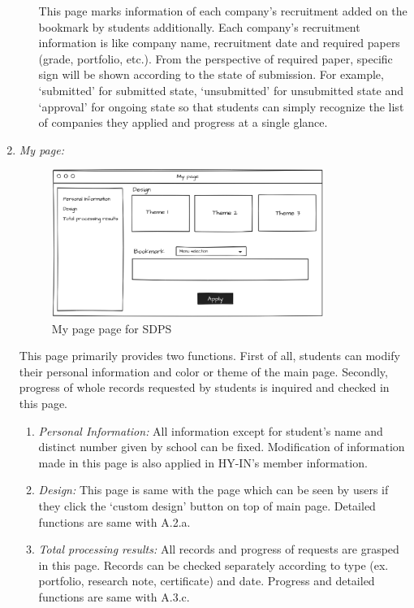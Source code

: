\documentclass[conference]{IEEEtran}
\begin{document}
\begin{enumerate}
\begin{enumerate}
        This page marks information of each company’s recruitment added on the bookmark by students additionally. Each company’s recruitment information is like company name, recruitment date and required papers (grade, portfolio, etc.). From the perspective of required paper, specific sign will be shown according to the state of submission. For example, ‘submitted’ for submitted state, ‘unsubmitted’ for unsubmitted state and ‘approval’ for ongoing state so that students can simply recognize the list of companies they applied and progress at a single glance.\\
    \end{enumerate}    
    \vspace{30mm}
       \item \textit {My page: }
       \begin{figure}[htbp]
	\centerline{\includegraphics[width=89mm,scale=0.5]{student/Mypage_design.png}}
	\caption{My page page for SDPS}
	\label{fig}
	\end{figure} 
       
       This page primarily provides two functions. First of all, students can modify their personal information and color or theme of the main page. Secondly, progress of whole records requested by students is inquired and checked in this page.\\
    \begin{enumerate}
    	\item  \textit{Personal Information:} All information except for student’s name and distinct number given by school can be fixed. Modification of information made in this page is also applied in HY-IN’s member information. \\
        \item  \textit{Design:} This page is same with the page which can be seen by users if they click the ‘custom design’ button on top of main page. Detailed functions are same with A.2.a.\\
        \item \textit{Total processing results:} All records and progress of requests are grasped in this page. Records can be checked separately according to type (ex. portfolio, research note, certificate) and date. Progress and detailed functions are same with A.3.c.\\
    \end{enumerate}  
        
\end{enumerate}
\end{document}
